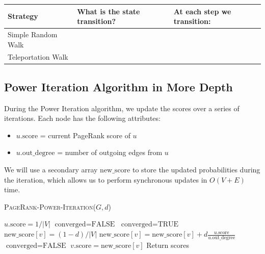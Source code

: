\documentclass[11pt]{exam}
\begin{document}
\begin{tabular}{| l | p{7cm} | p{6cm} |}
	\hline
	\textbf{Strategy} & \textbf{What is the state transition?} & At each step we transition: \\
	\hline
	Simple Random Walk &  \phantom{Follow a random outgoing edge uniformly} & \phantom{along edges according to transition probabilities} \phantom{more of the same stuff right here} \\
	\hline
	Teleportation Walk & & \phantom{by following an edge or jumping to a random node} \phantom{more of the same stuff right here}\\
	\hline
\end{tabular}

\begin{center}
\end{center}

\vs{1cm}

\begin{center}
\end{center}

\newpage
\subsection{Power Iteration Algorithm in More Depth}

During the Power Iteration algorithm, we update the scores over a series of iterations. Each node has the following attributes:
\begin{itemize}
	\item $u.\text{score}$ = current PageRank score of $u$
	\item $u.\text{out\_degree}$ = number of outgoing edges from $u$
\end{itemize}
We will use a secondary array $\text{new\_score}$ to store the updated probabilities during the iteration, which allows us to perform synchronous updates in $O(V + E)$ time. 

\begin{algorithm}
	\textsc{PageRank-Power-Iteration}($G,d$)
	\begin{algorithmic}
		\State $u.\text{score} = 1 / |V|$
		\EndFor
		\State $\text{converged} = \text{FALSE}$ 
		\State $\text{converged} = \text{TRUE}$
		\State $\text{new\_score}[v] = (1-d) / |V|$
		\State $\text{new\_score}[v] = \text{new\_score}[v] + d \frac{u.\text{score}}{u.\text{out\_degree}}$
		\EndFor
		\State $\text{converged} = \text{FALSE}$
		\EndIf
		\EndFor
		\State $v.\text{score} = \text{new\_score}[v]$
		\EndFor
		\EndWhile
		\State Return scores
	\end{algorithmic}
\end{algorithm}
\end{document}
